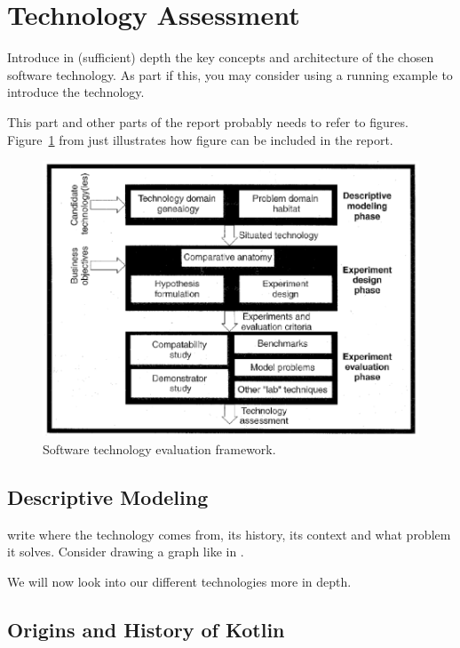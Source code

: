\section{Technology Assessment}
\label{sec:technology}



Introduce in (sufficient) depth the key concepts and architecture of the chosen software technology. As part if this, you may consider using a running example to introduce the technology.

This part and other parts of the report probably needs to refer to
figures. Figure~\ref{fig:framework} from \cite{brown:96} just
illustrates how figure can be included in the report.

\begin{figure}[thb]
	\centering
	\includegraphics[scale=0.5]{figs/framework.png}
	\caption{Software technology evaluation framework.}
	\label{fig:framework}
\end{figure}

\subsection{Descriptive Modeling}

write where the technology comes from, its history, its context and what problem it solves.
Consider drawing a graph like in \cite{brown:96}.

We will now look into our different technologies more in depth.

\subsection{Origins and History of Kotlin} 

